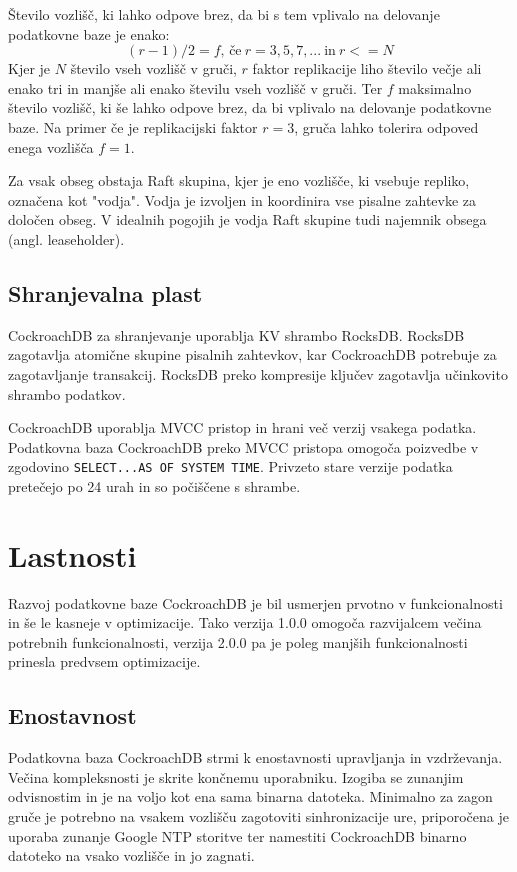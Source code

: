 \documentclass[a4paper, 12pt]{book}
\begin{document}
Število vozlišč, ki lahko odpove brez, da bi s tem vplivalo na delovanje podatkovne baze je enako:
\[(r - 1)/2 = f \text{, če}\ r = 3, 5, 7, ...\ \text{in}\ r <= N\]
Kjer je \(N\) število vseh vozlišč v gruči, \(r\) faktor replikacije liho število večje ali enako tri in manjše ali enako številu vseh vozlišč v gruči. Ter \(f\) maksimalno število vozlišč, ki še lahko odpove brez, da bi vplivalo na delovanje podatkovne baze. Na primer če je replikacijski faktor \(r = 3\), gruča lahko tolerira odpoved enega vozlišča \(f = 1\).

Za vsak obseg obstaja Raft skupina, kjer je eno vozlišče, ki vsebuje repliko, označena kot "vodja". Vodja je izvoljen in koordinira vse pisalne zahtevke za določen obseg. V idealnih pogojih je vodja Raft skupine tudi najemnik obsega (angl. leaseholder).


\subsection{Shranjevalna plast}

CockroachDB za shranjevanje uporablja KV shrambo RocksDB. RocksDB zagotavlja atomične skupine pisalnih zahtevkov, kar CockroachDB potrebuje za zagotavljanje transakcij. RocksDB preko kompresije ključev zagotavlja učinkovito shrambo podatkov.

CockroachDB uporablja MVCC pristop in hrani več verzij vsakega podatka. Podatkovna baza CockroachDB preko MVCC pristopa omogoča poizvedbe v zgodovino \texttt{SELECT...AS OF SYSTEM TIME}. Privzeto stare verzije podatka pretečejo po 24 urah in so počiščene s shrambe.

\section{Lastnosti}
Razvoj podatkovne baze CockroachDB je bil usmerjen prvotno v funkcionalnosti in še le kasneje v optimizacije. Tako verzija 1.0.0 omogoča razvijalcem večina potrebnih funkcionalnosti, verzija 2.0.0 pa je poleg manjših funkcionalnosti prinesla predvsem optimizacije.

\subsection{Enostavnost}
Podatkovna baza CockroachDB strmi k enostavnosti upravljanja in vzdr\-že\-van\-ja. Večina kompleksnosti je skrite končnemu uporabniku. Izogiba se zunanjim odvisnostim in je na voljo kot ena sama binarna datoteka. Minimalno za zagon gruče je potrebno na vsakem vozlišču zagotoviti sinhronizacije ure, priporočena je uporaba zunanje Google NTP storitve ter namestiti CockroachDB binarno datoteko na vsako vozlišče in jo zagnati.
\end{document}
